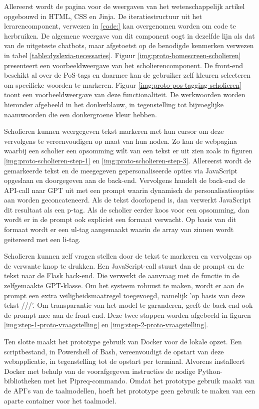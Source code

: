 \medspace

Allereerst wordt de pagina voor de weergaven van het wetenschappelijk artikel opgebouwd in HTML, CSS en Jinja. De iteratiestructuur uit het lerarencomponent, verwezen in \ref{code:} kan overgenomen worden om code te herbruiken. De algemene weergave van dit component oogt in dezelfde lijn als dat van de uitgeteste chatbots, maar afgetoetst op de benodigde kenmerken verwezen in tabel \ref{table:dyslexia-necessaries}. Figuur \ref{img:proto-homescreen-scholieren} presenteert een voorbeeldweergave van het scholierencomponent. De front-end beschikt al over de PoS-tags en daarmee kan de gebruiker zelf kleuren selecteren om specifieke woorden te markeren. Figuur \ref{img:proto-pos-tagging-scholieren} toont een voorbeeldweergave van deze functionaliteit. De werkwoorden worden hieronder afgebeeld in het donkerblauw, in tegenstelling tot bijvoeglijke naamwoorden die een donkergroene kleur hebben.

\medspace

Scholieren kunnen weergegeven tekst markeren met hun cursor om deze vervolgens te vereenvoudigen op maat van hun noden. Zo kan de webpagina waarbij een scholier een opsomming wilt van een tekst er uit zien zoals in figuren \ref{img:proto-scholieren-step-1} en \ref{img:proto-scholieren-step-3}. Allereerst wordt de gemarkeerde tekst en de meegegeven gepersonaliseerde opties via JavaScript opgeslaan en doorgegeven aan de back-end. Vervolgens handelt de back-end de API-call naar GPT uit met een prompt waarin dynamisch de personalisatieopties aan worden geconcateneerd. Als de tekst doorlopend is, dan verwerkt JavaScript dit resultaat als een p-tag. Als de scholier eerder koos voor een opsomming, dan wordt er in de prompt ook expliciet een formaat verwacht. Op basis van dit formaat wordt er een ul-tag aangemaakt waarin de array van zinnen wordt geitereerd met een li-tag.

\medspace

Scholieren kunnen zelf vragen stellen door de tekst te markeren en vervolgens op de verwante knop te drukken. Een JavaScript-call stuurt dan de prompt en de tekst naar de Flask back-end. Die verwerkt de aanvraag met de functie in de zelfgemaakte GPT-klasse. Om het systeem robuust te maken, wordt er aan de prompt een extra veiligheidsmaatregel toegevoegd, namelijk 'op basis van deze tekst ///'. Om transparantie van het model te garanderen, geeft de back-end ook de prompt mee aan de front-end. Deze twee stappen worden afgebeeld in figuren \ref{img:step-1-proto-vraagstelling} en \ref{img:step-2-proto-vraagstelling}.

\medspace

Ten slotte maakt het prototype gebruik van Docker voor de lokale opzet. Een scriptbestand, in Powershell of Bash, vereenvoudigt de opstart van deze webapplicatie, in tegenstelling tot de opstart per terminal. Alvorens installeert Docker met behulp van de voorafgegeven instructies de nodige Python-bibliotheken met het Pipreq-commando. Omdat het prototype gebruik maakt van de API's van de taalmodellen, hoeft het prototype geen gebruik te maken van een aparte container voor het taalmodel.